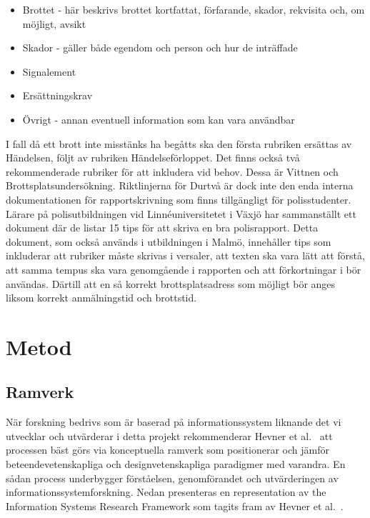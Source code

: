 \documentclass[swedish]{maucsthesis}
\begin{document}
\begin{itemize}
\item Brottet - här beskrivs brottet kortfattat, förfarande, skador, rekvisita
  och, om möjligt, avsikt
\item Skador - gäller både egendom och person och hur de inträffade
\item Signalement
\item Ersättningskrav
\item Övrigt - annan eventuell information som kan vara användbar
\end{itemize}

I fall då ett brott inte misstänks ha begåtts ska den första rubriken ersättas
av Händelsen, följt av rubriken Händelseförloppet. Det finns också två
rekommenderade rubriker för att inkludera vid behov. Dessa är Vittnen och
Brottsplatsundersökning. Riktlinjerna för Durtvå är dock inte den enda interna
dokumentationen för rapportskrivning som finns tillgängligt för polisstudenter.
Lärare på polisutbildningen vid Linnéuniversitetet i Växjö har sammanställt ett
dokument där de listar 15 tips för att skriva en bra polisrapport. Detta
dokument, som också används i utbildningen i Malmö, innehåller tips som
inkluderar att rubriker måste skrivas i versaler, att texten ska vara lätt att
förstå, att samma tempus ska vara genomgående i rapporten och att förkortningar
i bör användas. Därtill att en så korrekt brottsplatsadress som möjligt bör
anges liksom korrekt anmälningstid och brottstid.

\section{Metod}

\subsection{Ramverk}

När forskning bedrivs som är baserad på informationssystem liknande det vi
utvecklar och utvärderar i detta projekt rekommenderar Hevner et al.~\cite{hevner:2004} att
processen bäst görs via konceptuella ramverk som positionerar och jämför
beteendevetenskapliga och designvetenskapliga paradigmer med varandra. En sådan
process underbygger förståelsen, genomförandet och utvärderingen av
informationssystemforskning. Nedan presenteras en representation av the
Information Systems Research Framework som tagits fram av Hevner et al.~\cite{hevner:2004}.
\end{document}
